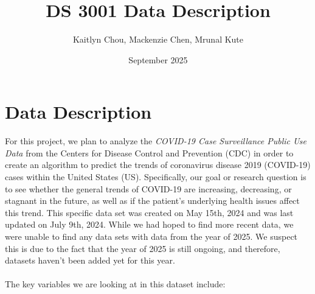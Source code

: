 \documentclass{article}
\title{DS 3001 Data Description}
\author{Kaitlyn Chou, Mackenzie Chen, Mrunal Kute}
\date{September 2025}
\begin{document}
\maketitle

\section{Data Description}
For this project, we plan to analyze the \textit{COVID-19 Case Surveillance Public Use Data} from the Centers for Disease Control and Prevention (CDC) in order to create an algorithm to predict the trends of coronavirus disease 2019 (COVID-19) cases within the United States (US). Specifically, our goal or research question is to see whether the general trends of COVID-19 are increasing, decreasing, or stagnant in the future, as well as if the patient's underlying health issues affect this trend. This specific data set was created on May 15th, 2024 and was last updated on July 9th, 2024. While we had hoped to find more recent data, we were unable to find any data sets with data from the year of 2025. We suspect this is due to the fact that the year of 2025 is still ongoing, and therefore, datasets haven't been added yet for this year. \\
\\
The key variables we are looking at in this dataset include:
\end{document}
